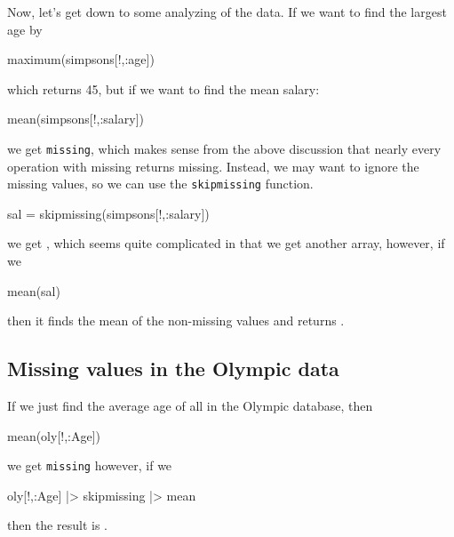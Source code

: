 Now, let's get down to some analyzing of the data. If we want to find the largest age by
%
\begin{jlblock}[data]
maximum(simpsons[!,:age])
\end{jlblock}
%
which returns 45, but if we want to find the mean salary:

\begin{jlblock}[data]
mean(simpsons[!,:salary])
\end{jlblock}
%
we get \texttt{missing}, which makes sense from the above discussion
that nearly every operation with missing returns missing. Instead, we
may want to ignore the missing values, so we can use the
\texttt{skipmissing} function.

\begin{jlblock}[data]
sal = skipmissing(simpsons[!,:salary])
\end{jlblock}

we get  \printpythontex[verb], which seems quite complicated in that we get another array, however, if we
%
\begin{jlblock}[data]
mean(sal)
\end{jlblock}
%
then it finds the mean of the non-missing values and returns  \printpythontex[verb]. 


\subsection{Missing values in the Olympic data}

If we just find the average age of all in the Olympic database, then

\begin{jlblock}[data]
mean(oly[!,:Age])
\end{jlblock}
%
we get \texttt{missing} however, if we
%
\begin{jlblock}[data]
oly[!,:Age] |> skipmissing |> mean 
\end{jlblock}
%
then the result is  \printpythontex[verb]. 
